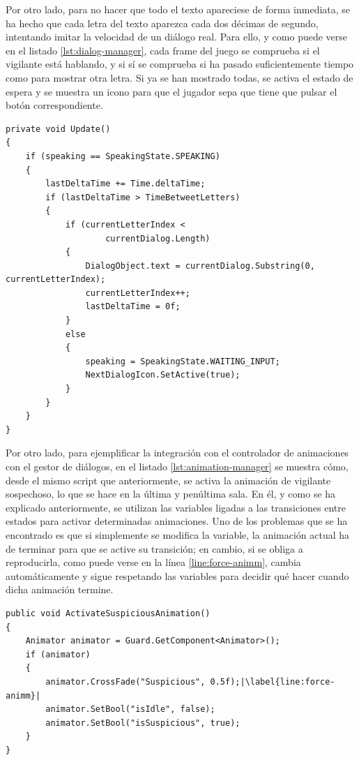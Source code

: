 Por otro lado, para no hacer que todo el texto apareciese de forma inmediata, se ha hecho que cada letra del texto aparezca cada dos décimas de segundo, intentando imitar la velocidad de un diálogo real. Para ello, y como puede verse en el listado \ref{lst:dialog-manager}, cada frame del juego se comprueba si el vigilante está hablando, y si sí se comprueba si ha pasado suficientemente tiempo como para mostrar otra letra. Si ya se han mostrado todas, se activa el estado de espera y se muestra un icono para que el jugador sepa que tiene que pulsar el botón correspondiente.

\begin{lstlisting}[caption=Fragmento del script del gestor de diálogos, label=lst:dialog-manager]
private void Update()
{
    if (speaking == SpeakingState.SPEAKING)
    {
        lastDeltaTime += Time.deltaTime;
        if (lastDeltaTime > TimeBetweetLetters)
        {
            if (currentLetterIndex < 
                    currentDialog.Length)
            {
                DialogObject.text = currentDialog.Substring(0, currentLetterIndex);
                currentLetterIndex++;
                lastDeltaTime = 0f;
            }
            else
            {
                speaking = SpeakingState.WAITING_INPUT;
                NextDialogIcon.SetActive(true);
            }
        }
    }
}
\end{lstlisting}

Por otro lado, para ejemplificar la integración con el controlador de animaciones con el gestor de diálogos, en el listado \ref{lst:animation-manager} se muestra cómo, desde el mismo script que anteriormente, se activa la animación de vigilante sospechoso, lo que se hace en la última y penúltima sala. En él, y como se ha explicado anteriormente, se utilizan las variables ligadas a las transiciones entre estados para activar determinadas animaciones. Uno de los problemas que se ha encontrado es que si simplemente se modifica la variable, la animación actual ha de terminar para que se active su transición; en cambio, si se obliga a reproducirla, como puede verse en la línea \ref{line:force-animm}, cambia automáticamente y sigue respetando las variables para decidir qué hacer cuando dicha animación termine.

\begin{lstlisting}[caption=Fragmento del script para activar animaciones, label=lst:animation-manager, escapechar=|]
public void ActivateSuspiciousAnimation()
{
    Animator animator = Guard.GetComponent<Animator>();
    if (animator)
    {
        animator.CrossFade("Suspicious", 0.5f);|\label{line:force-animm}|
        animator.SetBool("isIdle", false);
        animator.SetBool("isSuspicious", true);
    }
}
\end{lstlisting}

